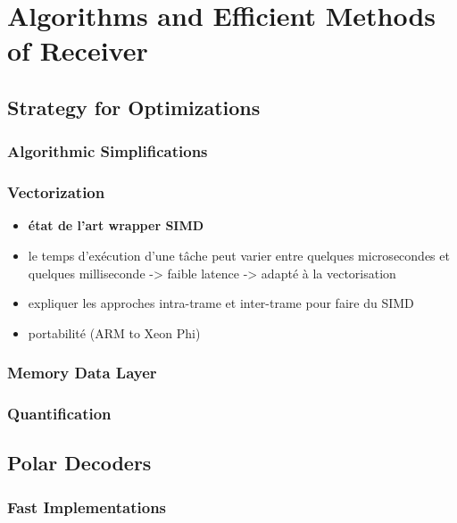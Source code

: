 \chapter{Algorithms and Efficient Methods of Receiver}

\section{Strategy for Optimizations}

\subsection{Algorithmic Simplifications}

\subsection{Vectorization~\cite{Cassagne2018}}

\begin{itemize}
  \item \textbf{état de l'art wrapper SIMD}
  \item le temps d'exécution d'une tâche peut varier entre quelques
        microsecondes et quelques milliseconde -> faible latence -> adapté à la
        vectorisation
  \item expliquer les approches intra-trame et inter-trame pour faire du SIMD
  \item portabilité (ARM to Xeon Phi)
\end{itemize}

\subsection{Memory Data Layer}

\subsection{Quantification}

\section{Polar Decoders~\cite{Cassagne2015c,Cassagne2016b,Leonardon2019}}

\subsection{Fast Implementations}

